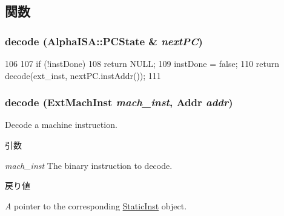 \subsection{関数}
\hypertarget{classAlphaISA_1_1Decoder_a2091be56e44739383015a4ef7347dc7a}{
\subsubsection[{decode}]{ decode ({\bf AlphaISA::PCState} \& {\em nextPC})}}
\label{classAlphaISA_1_1Decoder_a2091be56e44739383015a4ef7347dc7a}



\begin{DoxyCode}
106     {
107         if (!instDone)
108             return NULL;
109         instDone = false;
110         return decode(ext_inst, nextPC.instAddr());
111     }
\end{DoxyCode}
\hypertarget{classAlphaISA_1_1Decoder_a4ed948f8d08575cc2916fe32154ea69d}{
\subsubsection[{decode}]{ decode ({\bf ExtMachInst} {\em mach\_\-inst}, \/  {\bf Addr} {\em addr})}}
\label{classAlphaISA_1_1Decoder_a4ed948f8d08575cc2916fe32154ea69d}
Decode a machine instruction. 
\begin{DoxyParams}{引数}
\item[{\em mach\_\-inst}]The binary instruction to decode. \end{DoxyParams}

\begin{DoxyRetVals}{戻り値}
\item[{\em A}]pointer to the corresponding \hyperlink{classStaticInst}{StaticInst} object. \end{DoxyRetVals}



